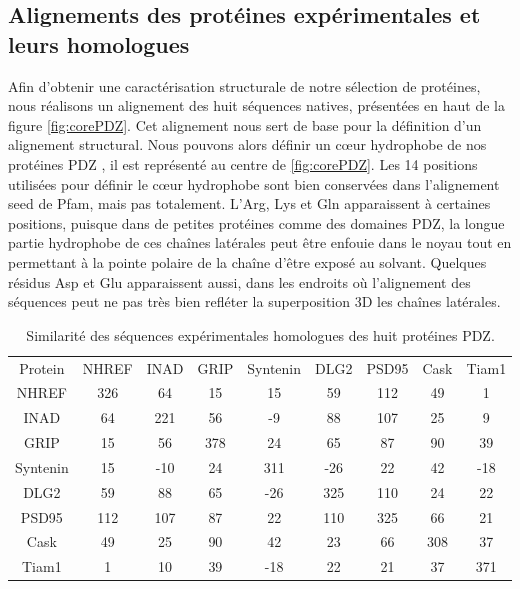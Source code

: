 \subsection{Alignements des protéines expérimentales et leurs homologues}

Afin d'obtenir une caractérisation structurale de notre sélection de protéines, nous réalisons un alignement des huit séquences natives, présentées en haut de la figure \ref{fig:corePDZ}. Cet alignement nous sert de base pour la définition d'un alignement structural. Nous pouvons alors définir un cœur hydrophobe de nos protéines \og PDZ \fg , il est représenté au centre de \ref{fig:corePDZ}. Les 14 positions utilisées pour définir le cœur hydrophobe sont bien conservées dans l'alignement \og seed \fg de Pfam, mais pas totalement. L'Arg, Lys et Gln apparaissent à certaines positions, puisque dans de petites protéines comme des domaines PDZ, la longue partie hydrophobe de ces chaînes latérales peut être enfouie dans le noyau tout en permettant à la pointe polaire de la chaîne d'être exposé au solvant. Quelques résidus Asp et Glu apparaissent aussi, dans les endroits où l'alignement des séquences peut ne pas très bien refléter la superposition 3D les chaînes latérales.

    \begin{table}[!htbp]
      \centering
      \caption{Similarité des séquences expérimentales homologues des huit protéines PDZ.}
      \begin{tabular}{ccccccccc}
        \toprule
        Protein & NHREF        & INAD      & GRIP        & Syntenin        & DLG2       & PSD95       & Cask       & Tiam1 \\
        \cmidrule{1-9}

        NHREF    & 326 &  64 &  15 &  15 &  59 & 112 & 49  &   1  \\     
        INAD    &  64 & 221 &  56 &  -9 &  88 & 107 & 25  &   9  \\
        GRIP    &  15 &  56 & 378 &  24 &  65 &  87 & 90  &  39  \\
        Syntenin    &  15 & -10 &  24 & 311 & -26 &  22 & 42  & -18  \\
        DLG2    &  59 &  88 &  65 & -26 & 325 & 110 & 24  &  22  \\
        PSD95    & 112 & 107 &  87 &  22 & 110 & 325 & 66  &  21  \\
        Cask    &  49 &  25 &  90 &  42 &  23 &  66 & 308 & 37   \\
        Tiam1   &  1  &  10 &  39 & -18 &  22 &  21 & 37  & 371 \\
        \bottomrule
      \end{tabular} 
\label{tab:Xsimil}      
    \end{table}

